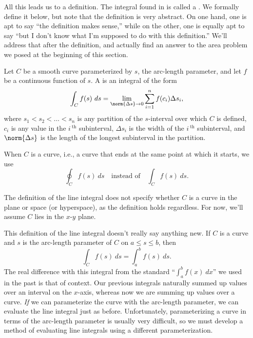 All this leads us to a definition. The integral found in  is called a . We formally define it below, but note that the definition is very abstract. On one hand, one is apt to say ``the definition makes sense,'' while on the other, one is equally apt to say ``but I don't know what I'm supposed to do with this definition.'' We'll address that after the definition, and actually find an answer to the area problem we posed at the beginning of this section.


{Let $C$ be a smooth curve parameterized by $s$, the arc-length parameter, and let $f$ be a continuous function of $s$. A  is an integral of the form
\[\int_C f(s)\ ds = \lim_{\norm{\Delta s}\to 0}\sum_{i=1}^n f(c_i)\Delta s_i,\]
where $s_1<s_2<\dots<s_n$ is any partition of the $s$-interval over which $C$ is defined, $c_i$ is any value in the $i\,^\text{th}$ subinterval,  $\Delta s_i$ is the width of the $i\,^\text{th}$ subinterval, and $\norm{\Delta s}$ is the length of the longest subinterval in the partition.}

When $C$ is a  curve, i.e., a curve that ends at the same point at which it starts,  we use
\[\oint_C f(s)\ ds \quad \text{instead of}\quad \int_Cf(s)\ ds.\]

The definition of the line integral does not specify whether $C$ is a curve in the plane or space (or hyperspace), as the definition holds regardless. For now, we'll assume $C$ lies in the $x$-$y$ plane.

This definition of the line integral  doesn't really say anything new. If $C$ is a curve and $s$ is the arc-length parameter of $C$ on $a\leq s\leq b$, then 
\[\int_Cf(s)\ ds = \int_a^bf(s)\ ds.\]
The real difference with this integral from the standard ``$\int_a^bf(x)\ dx$'' we used in the past is that of context. Our previous integrals naturally summed up values over an interval on the $x$-axis, whereas now we are summing up values over a curve. \emph{If} we can parameterize the curve with the arc-length parameter, we can evaluate the line integral just as before. Unfortunately, parameterizing a curve in terms of the arc-length parameter is usually very difficult, so we must develop a method of evaluating line integrals using a different parameterization.

